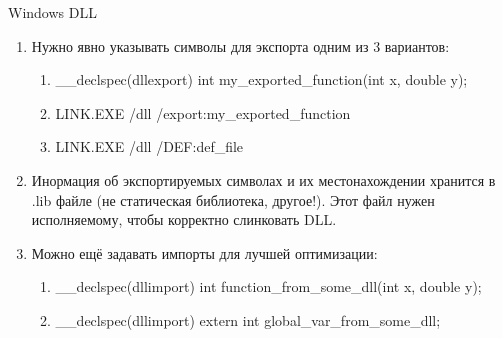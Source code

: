 \documentclass[10pt]{beamer}
\begin{document}
\begin{frame}{Windows DLL}
\begin{enumerate}
\item{ Нужно явно указывать символы для экспорта одним из 3 вариантов:
    \begin{enumerate}
        \item \_\_declspec(dllexport) int my\_exported\_function(int x, double y);
        \item LINK.EXE /dll /export:my\_exported\_function
        \item LINK.EXE /dll /DEF:def\_file
    \end{enumerate}
}
\item Инормация об экспортируемых символах и их местонахождении хранится в .lib файле (не статическая библиотека, другое!). Этот файл нужен исполняемому, чтобы корректно слинковать DLL.
\item{ Можно ещё задавать импорты для лучшей оптимизации:
    \begin{enumerate}
        \item \_\_declspec(dllimport) int function\_from\_some\_dll(int x, double y);
        \item \_\_declspec(dllimport) extern int global\_var\_from\_some\_dll;
    \end{enumerate}
}
\end{enumerate}
\end{frame}
\end{document}
